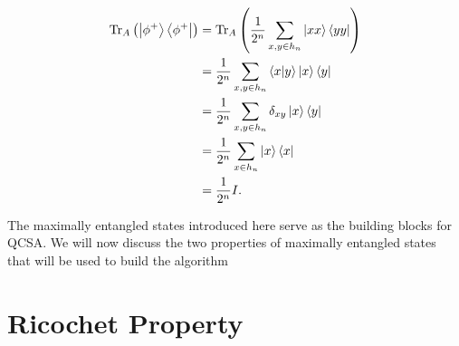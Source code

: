 \documentclass[10pt]{article}
\begin{document}
\begin{align}
\text{Tr}_A
\left(
\ket{\phi^+}\bra{\phi^+}
\right)
&=
\text{Tr}_A
\left(
\frac{1}{2^n}
\sum_{x,y\in h_n}\ket{xx}\bra{yy}
\right)
\nonumber
\\
&=
\frac{1}{2^n}
\sum_{x,y\in h_n}\bra{x}\ket{y}\ket{x}\bra{y}
\nonumber
\\
&=
\frac{1}{2^n}
\sum_{x,y\in h_n}\delta_{xy}\ket{x}\bra{y}
\nonumber
\\
&=
\frac{1}{2^n}
\sum_{x\in h_n}\ket{x}\bra{x}
\nonumber
\\
&=
\frac{1}{2^n}I
.\end{align}

The maximally entangled states introduced here serve as the building blocks for QCSA. We will now discuss the two properties of maximally entangled states that will be used to build the algorithm

\section{Ricochet Property}
\end{document}
